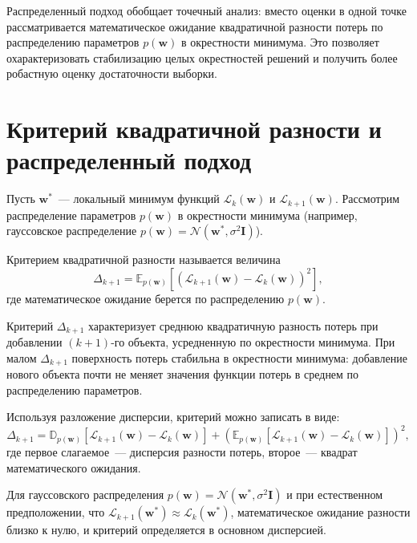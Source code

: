 Распределенный подход обобщает точечный анализ: вместо оценки в одной точке рассматривается математическое ожидание квадратичной разности потерь по распределению параметров $p(\mathbf{w})$ в окрестности минимума. Это позволяет охарактеризовать стабилизацию целых окрестностей решений и получить более робастную оценку достаточности выборки.

\section{Критерий квадратичной разности и распределенный подход}

Пусть $\mathbf{w}^*$~--- локальный минимум функций $\mathcal{L}_k(\mathbf{w})$ и $\mathcal{L}_{k+1}(\mathbf{w})$. Рассмотрим распределение параметров $p(\mathbf{w})$ в окрестности минимума (например, гауссовское распределение $p(\mathbf{w}) = \mathcal{N}(\mathbf{w}^*, \sigma^2 \mathbf{I})$).

\begin{definition}
Критерием квадратичной разности называется величина
\begin{equation}
\label{eq:delta-criterion}
\Delta_{k+1} = \mathbb{E}_{p(\mathbf{w})}\left[\left(\mathcal{L}_{k+1}(\mathbf{w}) - \mathcal{L}_k(\mathbf{w})\right)^2\right],
\end{equation}
где математическое ожидание берется по распределению $p(\mathbf{w})$.
\end{definition}

Критерий $\Delta_{k+1}$ характеризует среднюю квадратичную разность потерь при добавлении $(k+1)$-го объекта, усредненную по окрестности минимума. При малом $\Delta_{k+1}$ поверхность потерь стабильна в окрестности минимума: добавление нового объекта почти не меняет значения функции потерь в среднем по распределению параметров.

Используя разложение дисперсии, критерий можно записать в виде:
\begin{equation}
\label{eq:delta-decomposition}
\Delta_{k+1} = \mathbb{D}_{p(\mathbf{w})}\left[\mathcal{L}_{k+1}(\mathbf{w}) - \mathcal{L}_k(\mathbf{w})\right] + \left(\mathbb{E}_{p(\mathbf{w})}\left[\mathcal{L}_{k+1}(\mathbf{w}) - \mathcal{L}_k(\mathbf{w})\right]\right)^2,
\end{equation}
где первое слагаемое~--- дисперсия разности потерь, второе~--- квадрат математического ожидания.

Для гауссовского распределения $p(\mathbf{w}) = \mathcal{N}(\mathbf{w}^*, \sigma^2 \mathbf{I})$ и при естественном предположении, что $\mathcal{L}_{k+1}(\mathbf{w}^*) \approx \mathcal{L}_k(\mathbf{w}^*)$, математическое ожидание разности близко к нулю, и критерий определяется в основном дисперсией.


